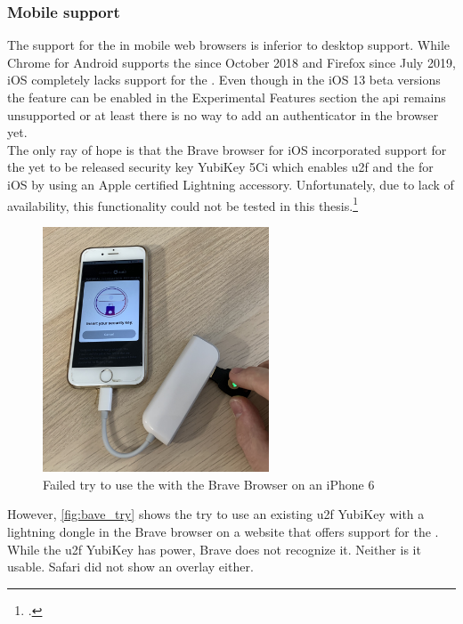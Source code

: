 \subsubsection{Mobile support}

The support for the \wa{} in mobile web browsers is inferior to desktop support. While Chrome for Android supports the \wa{} since October 2018 and Firefox since July 2019, iOS completely lacks support for the \wa. Even though in the iOS 13 beta versions the feature can be enabled in the \frqq Experimental Features\flqq{} section the \gls{api} remains unsupported or at least there is no way to add an authenticator in the browser yet.\\
The only ray of hope is that the Brave browser for iOS incorporated support for the yet to be released security key \frqq YubiKey 5Ci\flqq{} which enables \gls{u2f} and the \wa{} for iOS by using an Apple certified Lightning accessory. Unfortunately, due to lack of availability, this functionality could not be tested in this thesis.\footcites[See][]{brave-ios}[See][]{brave-now-available}
\\

\begin{figure}[hbt]
	\centering
	\includegraphics[width=0.6\textwidth]{pics/brave_try_dongle.eps}
	\caption[Failed try to use the \wa{} with the Brave Browser on an iPhone 6]{Failed try to use the \wa{} with the Brave Browser on an iPhone 6\footnotemark}
	\label{fig:bave_try}
\end{figure}

However, \autoref{fig:bave_try} shows the try to use an existing \gls{u2f} YubiKey with a lightning dongle in the Brave browser on a website that offers support for the \wa. While the \gls{u2f} YubiKey has power, Brave does not recognize it. Neither is it usable. Safari did not show an overlay either.

